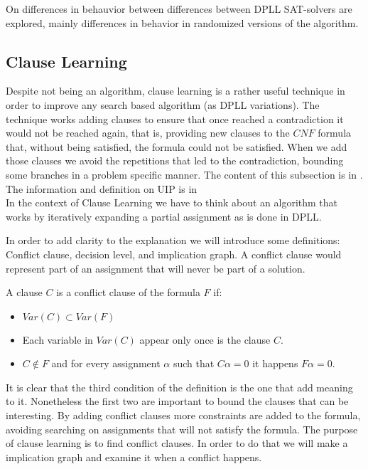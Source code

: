 On \cite{gomes2009exploiting} differences in behauvior between differences between DPLL SAT-solvers are explored, mainly differences in behavior in randomized versions of the algorithm.


\subsection{Clause Learning}

Despite not being an algorithm, clause learning is a rather useful technique in order to improve any search based algorithm (as DPLL variations).  The technique works adding clauses to ensure that once reached a contradiction it would not be reached again, that is, providing new clauses to the $CNF$ formula that, without being satisfied, the formula could not be satisfied. When we add those clauses we avoid the repetitions that led to the contradiction, bounding some branches in a problem specific manner.  The content of this subsection is in \cite{tichy2006clause}. The information and definition on UIP is in \cite{zhang2001efficient} \\

In the context of Clause Learning we have to think about an algorithm that works by iteratively expanding a partial assignment as is done in DPLL.


In order to add clarity to the explanation we will introduce some definitions: Conflict clause, decision level, and implication graph. A conflict clause would represent part of an assignment that will never be part of a solution.  

\begin{definition}
  A clause $C$ is a conflict clause of the formula $F$ if:
  \begin{itemize}
  \item $Var(C) \subset Var(F)$
  \item Each variable in $Var(C)$ appear only once is the clause $C$.  
  \item $C \not\in F$ and for every assignment $\alpha$ such that $C\alpha = 0$ it happens $F\alpha = 0$.
  \end{itemize}
\end{definition}

It is clear that the third condition of the definition is the one that add meaning to it. Nonetheless the first two are important to bound the clauses that can be interesting. By adding conflict clauses more constraints are added to the formula, avoiding searching on assignments that will not satisfy the formula. The purpose of clause learning is to find conflict clauses. In order to do that we will make a implication graph and examine it when a conflict happens.\\

